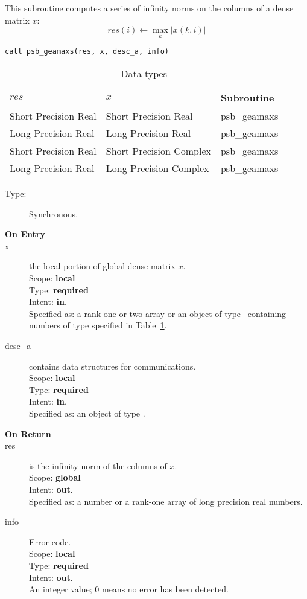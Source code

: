 This subroutine computes a series of  infinity norms on the columns of
a  dense matrix  $x$: 
\[ res(i) \leftarrow \max_k |x(k,i)| \]

\begin{verbatim}
call psb_geamaxs(res, x, desc_a, info)
\end{verbatim}

\begin{table}[h]
\begin{center}
\begin{tabular}{lll}
\hline
$res$&  $x$& {\bf Subroutine}\\
\hline
Short Precision Real    &Short Precision Real    & psb\_geamaxs\\
Long Precision Real    &Long Precision Real    & psb\_geamaxs\\
Short Precision Real &Short Precision Complex & psb\_geamaxs\\	
Long Precision Real &Long Precision Complex & psb\_geamaxs\\	
\hline
\end{tabular}
\end{center}
\caption{Data types\label{tab:f90mamax}}
\end{table}

\begin{description}
\item[Type:] Synchronous.
\item[\bf On Entry]
\item[x] the local portion of global dense matrix
$x$. \\
Scope: {\bf local} \\
Type: {\bf required} \\
Intent: {\bf in}.\\
Specified as: a rank one or two array or an object of type \vdata\ 
containing numbers of type specified in
Table~\ref{tab:f90mamax}. 
\item[desc\_a] contains data structures for communications.\\
Scope: {\bf local} \\
Type: {\bf required}\\
Intent: {\bf in}.\\
Specified as: an object of type \descdata.
\item[\bf On Return] 
\item[res] is the infinity norm of the columns of $x$.\\
Scope: {\bf global} \\
Intent: {\bf out}.\\
Specified as: a number or a rank-one array  of long precision real numbers. 
\item[info] Error code.\\
Scope: {\bf local} \\
Type: {\bf required} \\
Intent: {\bf out}.\\
An integer value; 0 means no error has been detected. 
\end{description}

